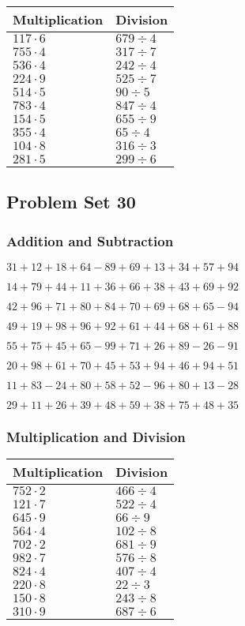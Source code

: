 \begin{longtable}[]{@{}ll@{}}
\toprule
Multiplication & Division\tabularnewline
\midrule
\endhead
\(117\cdot6\) & \(679÷4\)\tabularnewline
\(755\cdot4\) & \(317÷7\)\tabularnewline
\(536\cdot4\) & \(242÷4\)\tabularnewline
\(224\cdot9\) & \(525÷7\)\tabularnewline
\(514\cdot5\) & \(90÷5\)\tabularnewline
\(783\cdot4\) & \(847÷4\)\tabularnewline
\(154\cdot5\) & \(655÷9\)\tabularnewline
\(355\cdot4\) & \(65÷4\)\tabularnewline
\(104\cdot8\) & \(316÷3\)\tabularnewline
\(281\cdot5\) & \(299÷6\)\tabularnewline
\bottomrule
\end{longtable}

\hypertarget{problem-set-30}{%
\subsection{Problem Set 30}\label{problem-set-30}}

\hypertarget{addition-and-subtraction-29}{%
\subsubsection{Addition and
Subtraction}\label{addition-and-subtraction-29}}

\(31+12+18+64-89+69+13+34+57+94\)

\(14+79+44+11+36+66+38+43+69+92\)

\(42+96+71+80+84+70+69+68+65-94\)

\(49+19+98+96+92+61+44+68+61+88\)

\(55+75+45+65-99+71+26+89-26-91\)

\(20+98+61+70+45+53+94+46+94+51\)

\(11+83-24+80+58+52-96+80+13-28\)

\(29+11+26+39+48+59+38+75+48+35\)

\hypertarget{multiplication-and-division-29}{%
\subsubsection{Multiplication and
Division}\label{multiplication-and-division-29}}

\begin{longtable}[]{@{}ll@{}}
\toprule
Multiplication & Division\tabularnewline
\midrule
\endhead
\(752\cdot2\) & \(466÷4\)\tabularnewline
\(121\cdot7\) & \(522÷4\)\tabularnewline
\(645\cdot9\) & \(66÷9\)\tabularnewline
\(564\cdot4\) & \(102÷8\)\tabularnewline
\(702\cdot2\) & \(681÷9\)\tabularnewline
\(982\cdot7\) & \(576÷8\)\tabularnewline
\(824\cdot4\) & \(407÷4\)\tabularnewline
\(220\cdot8\) & \(22÷3\)\tabularnewline
\(150\cdot8\) & \(243÷8\)\tabularnewline
\(310\cdot9\) & \(687÷6\)\tabularnewline
\bottomrule
\end{longtable}

